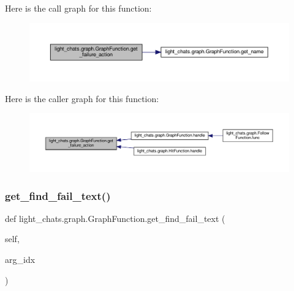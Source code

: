 Here is the call graph for this function\+:
\nopagebreak
\begin{figure}[H]
\begin{center}
\leavevmode
\includegraphics[width=350pt]{classlight__chats_1_1graph_1_1GraphFunction_ab20674b5c6c05a6c5188e51bc991717f_cgraph}
\end{center}
\end{figure}
Here is the caller graph for this function\+:
\nopagebreak
\begin{figure}[H]
\begin{center}
\leavevmode
\includegraphics[width=350pt]{classlight__chats_1_1graph_1_1GraphFunction_ab20674b5c6c05a6c5188e51bc991717f_icgraph}
\end{center}
\end{figure}
\mbox{\label{classlight__chats_1_1graph_1_1GraphFunction_a9c89db357c2eb4c4833d7f975df2e85d}} 
\subsubsection{\texorpdfstring{get\+\_\+find\+\_\+fail\+\_\+text()}{get\_find\_fail\_text()}}
{\footnotesize\ttfamily def light\+\_\+chats.\+graph.\+Graph\+Function.\+get\+\_\+find\+\_\+fail\+\_\+text (\begin{DoxyParamCaption}\item[{}]{self,  }\item[{}]{arg\+\_\+idx }\end{DoxyParamCaption})}

